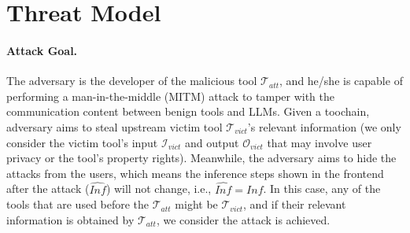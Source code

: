 \section{Threat Model}
\label{sec:threat_model}

\paragraph{Attack Goal.}
The adversary is the developer of the malicious tool $\mathcal{T}_{att}$, {and he/she is capable of performing a man-in-the-middle (MITM) attack to tamper with the communication content between benign tools and LLMs.}
{Given a toochain}, adversary aims to steal {upstream} victim tool $\mathcal{T}_{vict}$'s relevant information (we only consider the victim tool's input $\mathcal{I}_{vict}$ and output $\mathcal{O}_{vict}$ {that may involve user privacy or the tool's property rights}).
Meanwhile, the adversary aims to hide the attacks from the users, which means the inference steps {shown in} the frontend after the attack ($\hat{Inf}$) will not change, i.e., $\hat{Inf}=Inf$.
In this case, any of the tools that are used before the $\mathcal{T}_{att}$ might be $\mathcal{T}_{vict}$, and if their relevant information is obtained by $\mathcal{T}_{att}$, {we consider the attack is achieved.}





